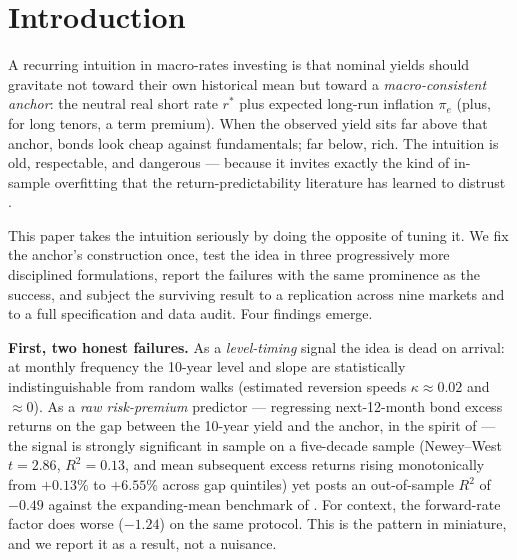 \documentclass[11pt]{article}
\begin{document}
\section{Introduction}

A recurring intuition in macro-rates investing is that nominal yields should gravitate not
toward their own historical mean but toward a \emph{macro-consistent anchor}: the neutral
real short rate $r^*$ plus expected long-run inflation $\pi_e$ (plus, for long tenors, a
term premium). When the observed yield sits far above that anchor, bonds look cheap against
fundamentals; far below, rich. The intuition is old, respectable, and dangerous --- because
it invites exactly the kind of in-sample overfitting that the return-predictability
literature has learned to distrust \citep{goyalwelch,bauerhamilton}.

This paper takes the intuition seriously by doing the opposite of tuning it. We fix the
anchor's construction once, test the idea in three progressively more disciplined
formulations, report the failures with the same prominence as the success, and subject the
surviving result to a replication across nine markets and to a full specification and data
audit. Four findings emerge.

\textbf{First, two honest failures.} As a \emph{level-timing} signal the idea is dead on
arrival: at monthly frequency the 10-year level and slope are statistically
indistinguishable from random walks (estimated reversion speeds $\kappa\approx 0.02$ and
$\approx 0$). As a \emph{raw risk-premium} predictor --- regressing next-12-month bond
excess returns on the gap between the 10-year yield and the anchor, in the spirit of
\citet{cieslakpovala} --- the signal is strongly significant in sample on a five-decade
sample (Newey--West $t=2.86$, $R^2=0.13$, and mean subsequent excess returns rising
monotonically from $+0.13\%$ to $+6.55\%$ across gap quintiles) yet posts an out-of-sample
$R^2$ of $-0.49$ against the expanding-mean benchmark of \citet{campbellthompson}. For
context, the \citet{cochranepiazzesi} forward-rate factor does worse ($-1.24$) on the same
protocol. This is the \citet{goyalwelch} pattern in miniature, and we report it as a
result, not a nuisance.
\end{document}
